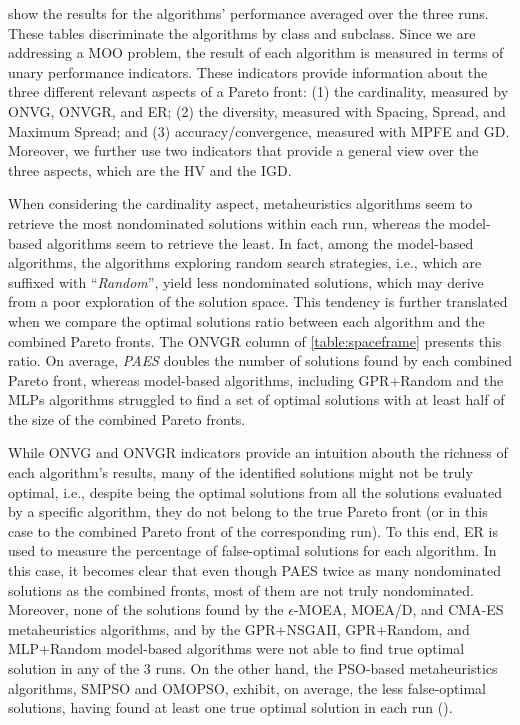 show the results for the algorithms' performance averaged over the three runs. These tables discriminate the algorithms by class and subclass. Since we are addressing a \ac{MOO} problem, the result of each algorithm is measured in terms of unary performance indicators. These indicators provide information about the three different relevant aspects of a Pareto front: (1) the cardinality, measured by \ac{ONVG}, \ac{ONVGR}, and \ac{ER}; (2) the diversity, measured with Spacing, Spread, and Maximum Spread; and (3) accuracy/convergence, measured with \ac{MPFE} and \ac{GD}. Moreover, we further use two indicators that provide a general view over the three aspects, which are the \ac{HV} and the \ac{IGD}. 

When considering the cardinality aspect, metaheuristics algorithms seem to retrieve the most nondominated solutions within each run, whereas the model-based algorithms seem to retrieve the least. In fact, among the model-based algorithms, the algorithms exploring random search strategies, i.e., which are suffixed with ``\textit{Random}'', yield less nondominated solutions, which may derive from a poor exploration of the solution space. This tendency is further translated when we compare the optimal solutions ratio between each algorithm and the combined Pareto fronts. The \ac{ONVGR} column of \cref{table:spaceframe} presents this ratio. On average, \textit{PAES} doubles the number of solutions found by each combined Pareto front, whereas model-based algorithms, including GPR+Random and the \acp{MLP} algorithms struggled to find a set of optimal solutions with at least half of the size of the combined Pareto fronts. 

While \ac{ONVG} and \ac{ONVGR} indicators provide an intuition abouth the richness of each algorithm's results, many of the identified solutions might not be truly optimal, i.e., despite being the optimal solutions from all the solutions evaluated by a specific algorithm, they do not belong to the true Pareto front (or in this case to the combined Pareto front of the corresponding run). To this end, \ac{ER} is used to measure the percentage of false-optimal solutions for each algorithm. In this case, it becomes clear that even though PAES twice as many nondominated solutions as the combined fronts, most of them are not truly nondominated. Moreover, none of the solutions found by the $\epsilon$-MOEA, MOEA/D, and CMA-ES metaheuristics algorithms, and by the GPR+NSGAII, GPR+Random, and MLP+Random model-based algorithms were not able to find true optimal solution in any of the 3 runs. On the other hand, the \ac{PSO}-based metaheuristics algorithms, SMPSO and OMOPSO, exhibit, on average, the less false-optimal solutions, having found at least one true optimal solution in each run ().

